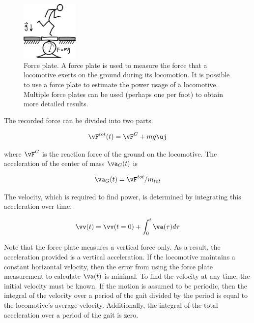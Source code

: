 \begin{figure}[h]		%
\begin{centering}
\includegraphics[width=0.25\textwidth]{Figures/ForcePlate}\par
\end{centering}
\caption[Diagram: Force Plate]{Force plate. A force plate is used to measure the force that a locomotive exerts on the ground during its locomotion. It is possible to use a force plate to estimate the power usage of a locomotive. Multiple force plates can be used (perhaps one per foot) to obtain more detailed results.}
\label{fig:ForcePlate}
\end{figure}
%

The recorded force can be divided into two parts.

\begin{equation}
\vF^{tot}(t) = \vF^{G} + mg \uj
\end{equation}

where $\vF^{G}$ is the reaction force of the ground on the locomotive. The acceleration of the center of mass $\va_{G}(t)$ is

\begin{equation}
\va_{G}(t) = \vF^{tot}/m_{tot}
\end{equation}

The velocity, which is required to find power, is determined by integrating this acceleration over time.

\begin{equation}
\vv(t) = \vv(t=0) + \int_{0}^{t} \va(\tau) d\tau
\label{eq:VelocityIntegral}
\end{equation}

Note that the force plate measures a vertical force only. As a result, the acceleration provided is a vertical acceleration. If the locomotive maintains a constant horizontal velocity, then the error from using the force plate measurement to calculate $\va(t)$ is minimal. To find the velocity at any time, the initial velocity must be known. If the motion is assumed to be periodic, then the integral of the velocity over a period of the gait divided by the period is equal to the locomotive's average velocity. Additionally, the integral of the total acceleration over a period of the gait is zero.

